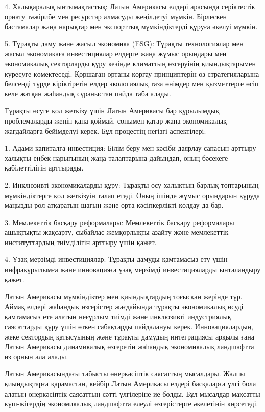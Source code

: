 \begin{multicols}{2}
4. Халықаралық ынтымақтастық: Латын Америкасы елдері арасында
серіктестік орнату тәжірибе мен ресурстар алмасуды жеңілдетуі мүмкін.
Бірлескен бастамалар жаңа нарықтар мен экспорттық мүмкіндіктерді құруға
әкелуі мүмкін.

5. Тұрақты даму және жасыл экономика (ESG): Тұрақты технологиялар мен
жасыл экономикаға инвестициялар елдерге жаңа жұмыс орындары мен
экономикалық секторларды құру кезінде климаттың өзгеруінің
қиындықтарымен күресуге көмектеседі. Қоршаған ортаны қорғау принциптерін
өз стратегияларына белсенді түрде кіріктіретін елдер экологиялық таза
өнімдер мен қызметтерге өсіп келе жатқан жаһандық сұраныстан пайда таба
алады.

Тұрақты өсуге қол жеткізу үшін Латын Америкасы бар құрылымдық
проблемаларды жеңіп қана қоймай, сонымен қатар жаңа экономикалық
жағдайларға бейімделуі керек. Бұл процестің негізгі аспектілері:

1. Адами капиталға инвестиция: Білім беру мен кәсіби даярлау сапасын
арттыру халықты еңбек нарығының жаңа талаптарына дайындап, оның бәсекеге
қабілеттілігін арттырады.

2. Инклюзивті экономикаларды құру: Тұрақты өсу халықтың барлық
топтарының мүмкіндіктерге қол жеткізуін талап етеді. Оның ішінде жұмыс
орындарын құруда маңызды рөл атқаратын шағын және орта кәсіпкерлікті
қолдау да бар.

3. Мемлекеттік басқару реформалары: Мемлекеттік басқару реформалары
ашықтықты жақсарту, сыбайлас жемқорлықты азайту және мемлекеттік
институттардың тиімділігін арттыру үшін қажет.

4. Ұзақ мерзімді инвестициялар: Тұрақты дамуды қамтамасыз ету үшін
инфрақұрылымға және инновацияға ұзақ мерзімді инвестицияларды
ынталандыру қажет.

Латын Америкасы мүмкіндіктер мен қиындықтардың тоғысқан жерінде тұр.
Аймақ елдері жаһандық өзгерістер жағдайында тұрақты экономикалық өсуді
қамтамасыз ете алатын неғұрлым тиімді және инклюзивті индустриялық
саясаттарды құру үшін өткен сабақтарды пайдалануы керек.
Инновациялардың, жеке сектордың қатысуының және тұрақты дамудың
интеграциясы арқылы ғана Латын Америкасы динамикалық өзгеретін жаһандық
экономикалық ландшафтта өз орнын ала алады.

Латын Америкасындағы табысты өнеркәсіптік саясаттың мысалдары. Жалпы
қиындықтарға қарамастан, кейбір Латын Америкасы елдері басқаларға үлгі
бола алатын өнеркәсіптік саясаттың сәтті үлгілеріне ие болды. Бұл
мысалдар мақсатты күш-жігердің экономикалық ландшафтта елеулі
өзгерістерге әкелетінін көрсетеді.


\end{multicols}
